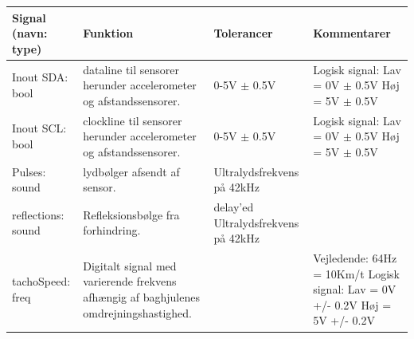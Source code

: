 \begin{table}[h]
	\centering
	\begin{tabularx}{\textwidth}{|l|Z|Z|Z|} \hline
	\textbf{Signal (navn: type)} & \textbf{Funktion} & \textbf{Tolerancer} & \textbf{Kommentarer} \\ \hline
Inout SDA: bool
	& \IIC dataline til sensorer herunder accelerometer og afstandssensorer. 
	& 0-5V $\pm$ 0.5V
 	& Logisk signal: \newline
		Lav = 0V $\pm$ 0.5V \newline
		Høj = 5V $\pm$ 0.5V
	\\ \hline

Inout SCL: bool
	& \IIC clockline  til sensorer herunder accelerometer og afstandssensorer. 
	& 0-5V $\pm$ 0.5V
 	& Logisk signal: \newline
		Lav = 0V $\pm$ 0.5V \newline
		Høj = 5V $\pm$ 0.5V
	\\ \hline

Pulses: sound
	& lydbølger afsendt af sensor. 
	& Ultralydsfrekvens på 42kHz
 	& ~
	\\ \hline
	
reflections: sound
	& Refleksionsbølge fra forhindring. 
	& delay'ed Ultralydsfrekvens på 42kHz
 	& ~
	\\ \hline
	
tachoSpeed: freq
	& Digitalt signal med varierende frekvens afhængig af baghjulenes omdrejningshastighed.
	& ~
	& Vejledende: \newline
		64Hz = 10Km/t \newline
		Logisk signal: \newline
		Lav = 0V +/- 0.2V \newline
		Høj = 5V +/- 0.2V	\\ \hline
	\end{tabularx}
\end{table}